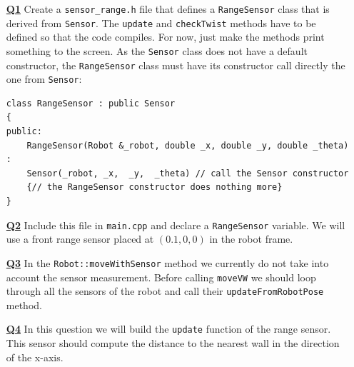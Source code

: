 \documentclass{ecnreport}
\begin{document}
\begin{itemize}
\medskip\item[\textbf{\underline{Q1}}] Create a \texttt{sensor\_range.h} file that defines a \texttt{RangeSensor} class that is derived from \texttt{Sensor}. The \texttt{update} and \texttt{checkTwist} methods have to be defined so that the code compiles. For now, just make the methods print something to the screen.
As the \texttt{Sensor} class does not have a default constructor, the \texttt{RangeSensor} class must have its constructor call directly the one from  \texttt{Sensor}:
\begin{center}\cppstyle
\begin{lstlisting}
class RangeSensor : public Sensor
{
public:
    RangeSensor(Robot &_robot, double _x, double _y, double _theta) :
	Sensor(_robot, _x,  _y,  _theta) // call the Sensor constructor
	{// the RangeSensor constructor does nothing more}
}    
\end{lstlisting}
\end{center}

\medskip\item[\textbf{\underline{Q2}}] Include this file in \texttt{main.cpp} and declare a \texttt{RangeSensor} variable.  We will use a front range sensor placed at $(0.1, 0,0)$ in the robot frame.

\medskip\item[\textbf{\underline{Q3}}] In the \texttt{Robot::moveWithSensor} method we currently do not take into account the sensor measurement. 
Before calling \texttt{moveVW} we should loop through all the sensors of the robot and call their \texttt{updateFromRobotPose} method.

\medskip\item[\textbf{\underline{Q4}}] In this question we will build the \texttt{update} function of the range sensor.
This sensor should compute the distance to the nearest wall in the direction of the x-axis.\\


\end{itemize}
\end{document}
